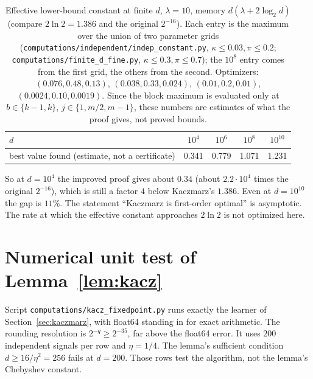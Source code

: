 \documentclass[11pt]{article}
\theoremstyle{definition}
\theoremstyle{remark}
\begin{document}
\begin{table}[h]
\centering\small
\begin{tabular}{@{}lcccc@{}}
\toprule
\(d\) & \(10^4\) & \(10^6\) & \(10^8\) & \(10^{10}\)\\
\midrule
best value found (estimate, not a certificate) & 0.341 & 0.779 & 1.071 & 1.231\\
\bottomrule
\end{tabular}
\caption{Effective lower-bound constant at finite \(d\), \(\lambda=10\), memory \(d(\lambda+2\log_2d)\) (compare \(2\ln2=1.386\) and the original \(2^{-16}\)).
Each entry is the maximum over the union of two parameter grids (\texttt{computations/independent/indep\_constant.py}, \(\kappa\le0.03,\pi\le0.2\);
\texttt{computations/finite\_d\_fine.py}, \(\kappa\le0.3,\pi\le0.7\)); the \(10^8\) entry comes from the first grid, the others from the second.
Optimizers: \((0.076,0.48,0.13)\), \((0.038,0.33,0.024)\), \((0.01,0.2,0.01)\), \((0.0024,0.10,0.0019)\). Since the block maximum is
evaluated only at \(b\in\{k-1,k\}\), \(j\in\{1,m/2,m-1\}\), these numbers are estimates of what the proof gives, not proved bounds.}
\label{tab:finite}
\end{table}

So at \(d=10^4\) the improved proof gives about \(0.34\) (about \(2.2\cdot10^4\) times the original \(2^{-16}\)), which is still a factor \(4\) below
Kaczmarz's \(1.386\). Even at \(d=10^{10}\) the gap is \(11\%\). The statement
``Kaczmarz is first-order optimal'' is asymptotic. The rate at which the effective constant approaches \(2\ln2\) is
not optimized here.

\section{Numerical unit test of Lemma~\ref{lem:kacz}}
Script \texttt{computations/kacz\_fixedpoint.py} runs exactly the learner of Section~\ref{sec:kaczmarz}, with float64 standing in for
exact arithmetic. The rounding resolution is \(2^{-q}\ge2^{-35}\), far above the float64 error. It uses \(200\) independent
signals per row and \(\eta=1/4\). The lemma's sufficient condition \(d\ge16/\eta^2=256\) fails at \(d=200\). Those rows test the
algorithm, not the lemma's Chebyshev constant.
\end{document}
